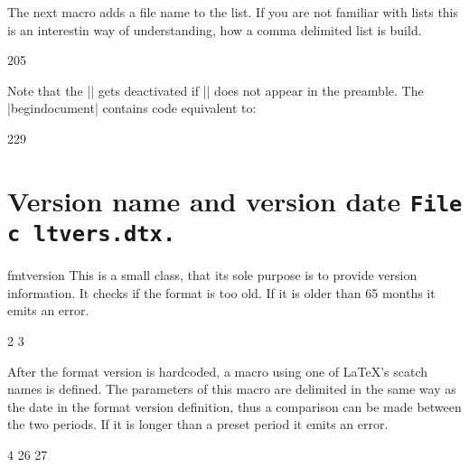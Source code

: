 The next macro adds a file name to the list. If you are not familiar with lists this is an interestin way of understanding, how a comma delimited list is build.

\begin{teXXX}
205 %
\end{teXXX}

Note that the |\@filelist| gets deactivated if |\listfiles| does not appear in the preamble. The |begin{document}|
contains code equivalent to:

\begin{teXXX}
\AtBeginDocument{%
  \ifx\@listfiles\@undefined
  \let\@filelist\relax
  \let\@addtofilelist\@gobble
\fi}
229 \@onlypreamble{} \let\@dofilelist\relax
\end{teXXX} 




\section{Version name and version date \texttt{File c ltvers.dtx.}}

\begin{macro}{\fmtname}
\begin{macro}{fmtversion}
This is a small class,  that its sole purpose is to provide version information. It checks
if the format is too old. If it is older than 65 months it emits an error. 
\end{macro}
\end{macro}


\begin{teXXX}
2 \def\fmtname{LaTeX2e}
3 \edef\fmtversion{2011/06/27}
\end{teXXX}

After the format version is hardcoded, a macro using one of LaTeX's scatch names is defined. The parameters
of this macro are delimited in the same way as the date in the format version definition, thus a comparison can be made between the two periods. If it is longer than a preset period it emits an error.

\begin{teXXX}
4 \iffalse
5 \def\reserved@a#1/#2/#3\@nil{%
6   \count@\year
7   \advance\count@-#1\relax
8   \multiply\count@ by 12\relax
9   \advance\count@\month
10 \advance\count@-#2\relax}
11 \expandafter\reserved@a\fmtversion\@nil
12 \ifnum\count@>65
13     \typeout{^^J%
14     !!!!!!!!!!!!!!!!!!!!!!!!!!!!!!!!!!!!!!!!!!!!!!!^^J%
15     ! You are attempting to make a LaTeX format from a source file^^J%
16     ! That is more than five years old.^^J%
17     !^^J%
18     ! If you enter <return> to scroll past this message then the format^^J%
19     ! will be built, but please consider obtaining newer source files^^J%
20     ! before continuing to build LaTeX.^^J%
21     !!!!!!!!!!!!!!!!!!!!!!!!!!!!!!!!!!!!!!!!!!!!!!!!^^J%
22     }
23     \errhelp{To avoid this error message, obtain new LaTeX sources.}
24     \errmessage{LaTeX source files more than 5 years old!}
25 \fi
26 \let\reserved@a\relax
27 \fi
\end{teXXX}

